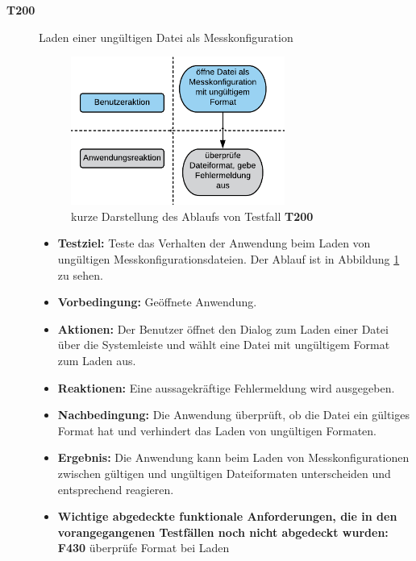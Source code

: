 \documentclass[parskip=full]{scrartcl}
\begin{document}
\begin{description} 

\item[\textbf{T200}] Laden einer ungültigen Datei als Messkonfiguration

\begin{figure}[htbp]
	\begin{center}
		\includegraphics[width = 7cm]{Grafik/T200-Ablauf.png}
		\caption{kurze Darstellung des Ablaufs von Testfall \textbf{T200}}
		\label{T200-Ablauf}
	\end{center}
\end{figure}
\begin{itemize}

\item []\textbf{Testziel:} Teste das Verhalten der Anwendung beim Laden von ungültigen Messkonfigurationsdateien. Der Ablauf ist in Abbildung \ref{T200-Ablauf} zu sehen.

\item []\textbf{Vorbedingung:} Geöffnete Anwendung.
\item []\textbf{Aktionen:} Der Benutzer öffnet den Dialog zum Laden einer Datei über die Systemleiste und wählt eine Datei mit ungültigem Format zum Laden aus.
\item []\textbf{Reaktionen:} Eine aussagekräftige Fehlermeldung wird ausgegeben.
\item []\textbf{Nachbedingung:} Die Anwendung überprüft, ob die Datei ein gültiges Format hat und verhindert das Laden von ungültigen Formaten. 


\item []\textbf{Ergebnis:} Die Anwendung kann beim Laden von Messkonfigurationen zwischen gültigen und ungültigen Dateiformaten unterscheiden und entsprechend reagieren.
\item []\textbf{Wichtige abgedeckte funktionale Anforderungen, die in den vorangegangenen Testfällen noch nicht abgedeckt wurden:} \textbf{F430} überprüfe Format bei Laden

\end{itemize}


\end{description}
\end{document}
